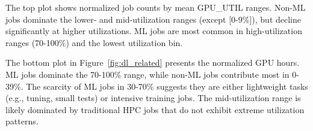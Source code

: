 The top plot shows normalized job counts by mean GPU\_UTIL ranges.
Non-ML jobs dominate the lower- and mid-utilization ranges (except [0-9\%]), but
decline significantly at higher utilizations.  ML jobs are most common in
high-utilization ranges (70-100\%) and the lowest utilization bin.

The bottom plot in Figure~\ref{fig:dl_related} presents the normalized GPU hours.
ML jobs dominate the 70-100\% range, while non-ML jobs contribute most in 0-39\%.
The scarcity of ML jobs in 30-70\% suggests they are either lightweight tasks
(e.g., tuning, small tests) or intensive training jobs. The mid-utilization
range is likely dominated by traditional HPC jobs that do not exhibit extreme
utilization patterns.

